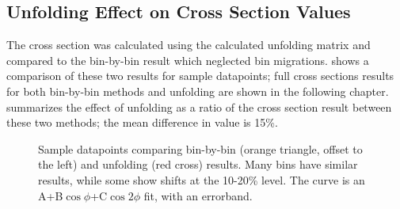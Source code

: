     \clearpage
    \subsection{Unfolding Effect on Cross Section Values}
    The cross section was calculated using the calculated unfolding matrix and compared to the bin-by-bin result which neglected bin migrations.  shows a comparison of these two results for sample datapoints; full cross sections results for both bin-by-bin methods and unfolding are shown in the following chapter.  summarizes the effect of unfolding as a ratio of the cross section result between these two methods; the mean difference in value is 15\%.
     

    \begin{figure}[H]
        \centering
    \caption[Bin-by-bin and Unfolded Cross Section Examples]{Sample datapoints comparing bin-by-bin (orange triangle, offset to the left) and unfolding (red cross) results. Many bins have similar results, while some show shifts at the 10-20\% level. The curve is an A+B$\cos{\phi}$+C$\cos{2\phi}$ fit, with an errorband.}\label{fig:binbybinIBU}
    \end{figure}

